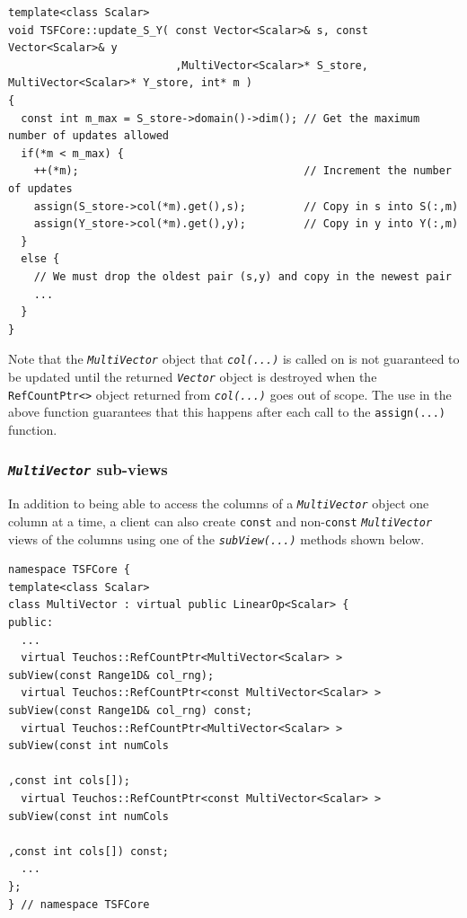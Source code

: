 {\scriptsize\begin{verbatim}
template<class Scalar>
void TSFCore::update_S_Y( const Vector<Scalar>& s, const Vector<Scalar>& y
                          ,MultiVector<Scalar>* S_store, MultiVector<Scalar>* Y_store, int* m )
{
  const int m_max = S_store->domain()->dim(); // Get the maximum number of updates allowed
  if(*m < m_max) {
    ++(*m);                                   // Increment the number of updates
    assign(S_store->col(*m).get(),s);         // Copy in s into S(:,m)         
    assign(Y_store->col(*m).get(),y);         // Copy in y into Y(:,m)
  }
  else {
    // We must drop the oldest pair (s,y) and copy in the newest pair
    ...
  }
}
\end{verbatim}}

{}\noindent{}Note that the \texttt{\textit{Multi\-Vector}} object that
\texttt{\textit{col(...)}} is called on is not guaranteed to be
updated until the returned \texttt{\textit{Vector}} object is
destroyed when the \texttt{RefCountPtr<>} object returned from
\texttt{\textit{col(...)}} goes out of scope.  The use in the above function
guarantees that this happens after each call to the
\texttt{assign(...)} function.

%
\subsubsection{\texttt{\textit{Multi\-Vector}} sub-views}
%

In addition to being able to access the columns of a
\texttt{\textit{Multi\-Vector}} object one column at a time, a client
can also create \texttt{const} and non-\texttt{const}
\texttt{\textit{Multi\-Vector}} views of the columns
using one of the \texttt{\textit{subView(...)}} methods shown below.

{\scriptsize\begin{verbatim}
namespace TSFCore {
template<class Scalar>
class MultiVector : virtual public LinearOp<Scalar> {
public:
  ...
  virtual Teuchos::RefCountPtr<MultiVector<Scalar> >       subView(const Range1D& col_rng);
  virtual Teuchos::RefCountPtr<const MultiVector<Scalar> > subView(const Range1D& col_rng) const;
  virtual Teuchos::RefCountPtr<MultiVector<Scalar> >       subView(const int numCols
                                                                        ,const int cols[]);
  virtual Teuchos::RefCountPtr<const MultiVector<Scalar> > subView(const int numCols
                                                                        ,const int cols[]) const;
  ...
};
} // namespace TSFCore
\end{verbatim}}

